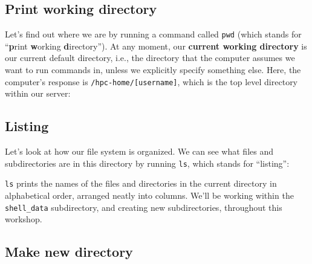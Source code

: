 \documentclass[
  letterpaper,
  DIV=11,
  numbers=noendperiod]{scrreprt}
\newenvironment{Shaded}{\begin{snugshade}}{\end{snugshade}}
\newcommand{\ExtensionTok}[1]{\textcolor[rgb]{0.00,0.23,0.31}{#1}}
\newcommand{\NormalTok}[1]{\textcolor[rgb]{0.00,0.23,0.31}{#1}}
\begin{document}
\begin{Shaded}
\begin{Highlighting}[]
\ExtensionTok{$}
\end{Highlighting}
\end{Shaded}

\subsection{Print working directory}\label{print-working-directory}

Let's find out where we are by running a command called \texttt{pwd}
(which stands for ``\textbf{p}rint \textbf{w}orking
\textbf{d}irectory''). At any moment, our \textbf{current working
directory} is our current default directory, i.e., the directory that
the computer assumes we want to run commands in, unless we explicitly
specify something else. Here, the computer's response is
\texttt{/hpc-home/{[}username{]}}, which is the top level directory
within our server:

\begin{Shaded}
\end{Shaded}

\subsection{Listing}\label{listing}

Let's look at how our file system is organized. We can see what files
and subdirectories are in this directory by running \texttt{ls}, which
stands for ``listing'':

\begin{Shaded}
\end{Shaded}

\texttt{ls} prints the names of the files and directories in the current
directory in alphabetical order, arranged neatly into columns. We'll be
working within the \texttt{shell\_data} subdirectory, and creating new
subdirectories, throughout this workshop.

\subsection{Make new directory}\label{make-new-directory}
\end{document}
